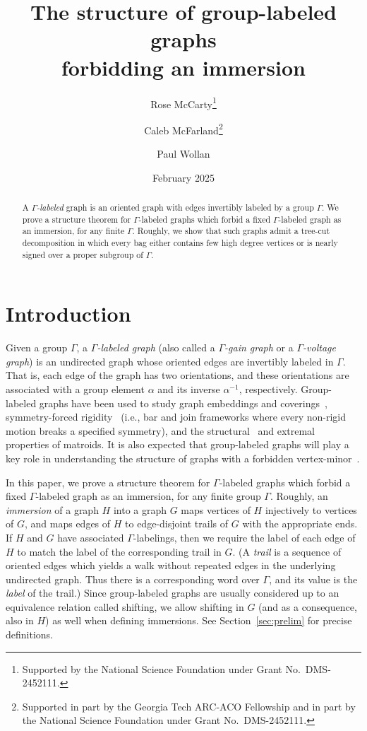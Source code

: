 \documentclass[11pt]{article}
\title{The structure of group-labeled graphs\\ forbidding an immersion}
\author{Rose McCarty\thanks{Supported by the National Science Foundation under Grant No.~DMS-2452111.}}
\affil{Schools of Mathematics and Computer Science, Georgia Institute of Technology, USA.}
\author{Caleb McFarland\thanks{Supported in part by the Georgia Tech ARC-ACO Fellowship and in part by the National Science Foundation under Grant No.~DMS-2452111.}}
\affil{School of Mathematics, Georgia Institute of Technology, USA.}
\author{Paul Wollan}
\affil{Sapienza Universit\`{a} di Roma, Italy.}
\date{February 2025}
\theoremstyle{definition}
\begin{document}
\maketitle

\begin{abstract}
    A \emph{$\Gamma$-labeled} graph is an oriented graph with edges invertibly labeled by a group $\Gamma$. We prove a structure theorem for $\Gamma$-labeled graphs which forbid a fixed $\Gamma$-labeled graph as an immersion, for any finite $\Gamma$. Roughly, we show that such graphs admit a tree-cut decomposition in which every bag either contains few high degree vertices or is nearly signed over a proper subgroup of $\Gamma$. %
\end{abstract}

\section{Introduction}

Given a group $\Gamma$, a \emph{$\Gamma$-labeled graph} (also called a \emph{$\Gamma$-gain graph} or a \emph{$\Gamma$-voltage graph}) is an undirected graph whose oriented edges are invertibly labeled in $\Gamma$. That is, each edge of the graph has two orientations, and these orientations are associated with a group element $\alpha$ and its inverse $\alpha^{-1}$, respectively. Group-labeled graphs have been used to study graph embeddings and coverings~\cite{Gross74, GrossTucker77, GrossTucker01}, symmetry-forced rigidity~\cite{Bernstein22, KST21, Tanigawa15} (i.e., bar and join frameworks where every non-rigid motion breaks a specified symmetry), and the structural~\cite{GGW14, GerardsGraphicMatroids, SeymourGraphicMatroids} and extremal~\cite{NW22, PSWX24} properties of matroids. It is also expected that group-labeled graphs will play a key role in understanding the structure of graphs with a forbidden vertex-minor~\cite{BouchetCircleChar, McCartyThesis, decomposingSigned}.



In this paper, we prove a structure theorem for $\Gamma$-labeled graphs which forbid a fixed $\Gamma$-labeled graph as an immersion, for any finite group $\Gamma$. Roughly, an \emph{immersion} of a graph $H$ into a graph $G$ maps vertices of $H$ injectively to vertices of $G$, and maps edges of $H$ to edge-disjoint trails of $G$ with the appropriate ends. If $H$ and $G$ have associated $\Gamma$-labelings, then we require the label of each edge of $H$ to match the label of the corresponding trail in $G$. (A \emph{trail} is a sequence of oriented edges which yields a walk without repeated edges in the underlying undirected graph. Thus there is a corresponding word over $\Gamma$, and its value is the \emph{label} of the trail.) Since group-labeled graphs are usually considered up to an equivalence relation called shifting, we allow shifting in $G$ (and as a consequence, also in $H$) as well when defining immersions. See Section~\ref{sec:prelim} for precise definitions.
\end{document}
